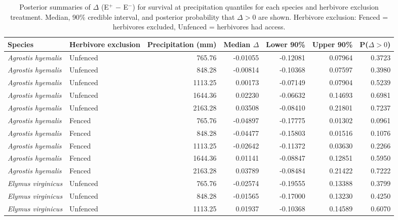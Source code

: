 \documentclass[12pt]{article}\usepackage[]{graphicx}\usepackage[dvipsnames]{xcolor}
\begin{document}
\begin{landscape}
\begin{table}[ht]
\centering
\small
\caption[Summaries of $\Delta$ (E$^{+}$ $-$ E$^{-}$) for survival across precipitation quantiles]{Posterior summaries of $\Delta$ (E$^{+}$ $-$ E$^{-}$) for survival at precipitation quantiles for each species and herbivore exclusion treatment. 
Median, 90\% credible interval, and posterior probability that $\Delta > 0$ are shown. 
Herbivore exclusion: Fenced = herbivores excluded, Unfenced = herbivores had access.}
\label{tab:delta_summary_surv}
\begin{tabular}{llrrrrr}
\hline
\textbf{Species} & \textbf{Herbivore exclusion} & \textbf{Precipitation (mm)} & \textbf{Median $\Delta$} & \textbf{Lower 90\%} & \textbf{Upper 90\%} & \textbf{P($\Delta>0$)} \\
\hline
\textit{Agrostis hyemalis} & Unfenced & 765.76  & -0.01055 & -0.12081 & 0.07964  & 0.3723 \\
\textit{Agrostis hyemalis} & Unfenced & 848.28  & -0.00814 & -0.10368 & 0.07597  & 0.3980 \\
\textit{Agrostis hyemalis} & Unfenced & 1113.25 & 0.00173  & -0.07149 & 0.07904  & 0.5239 \\
\textit{Agrostis hyemalis} & Unfenced & 1644.36 & 0.02230  & -0.06632 & 0.14693  & 0.6981 \\
\textit{Agrostis hyemalis} & Unfenced & 2163.28 & 0.03508  & -0.08410 & 0.21801  & 0.7237 \\
\textit{Agrostis hyemalis} & Fenced   & 765.76  & -0.04897 & -0.17775 & 0.01302  & 0.0961 \\
\textit{Agrostis hyemalis} & Fenced   & 848.28  & -0.04477 & -0.15803 & 0.01516  & 0.1076 \\
\textit{Agrostis hyemalis} & Fenced   & 1113.25 & -0.02642 & -0.11372 & 0.03630  & 0.2266 \\
\textit{Agrostis hyemalis} & Fenced   & 1644.36 & 0.01141  & -0.08847 & 0.12851  & 0.5950 \\
\textit{Agrostis hyemalis} & Fenced   & 2163.28 & 0.03789  & -0.08484 & 0.21422  & 0.7222 \\
\textit{Elymus virginicus} & Unfenced & 765.76  & -0.02574 & -0.19555 & 0.13388  & 0.3799 \\
\textit{Elymus virginicus} & Unfenced & 848.28  & -0.01565 & -0.17000 & 0.13230  & 0.4250 \\
\textit{Elymus virginicus} & Unfenced & 1113.25 & 0.01937  & -0.10368 & 0.14589  & 0.6070 \\

\end{tabular}
\end{table}
\end{landscape}
\end{document}

